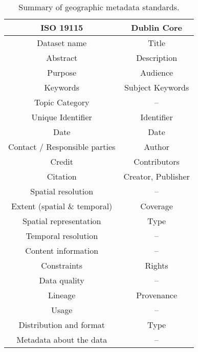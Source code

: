 \documentclass{isprs} %
\begin{document}
\begin{table}[h]
	\centering
		\begin{tabular}{|c|c|}\hline
		    ISO 19115 &                     Dublin Core\\\hline
			Dataset name &                  Title  \\
			Abstract &                      Description \\
			Purpose &                       Audience \\
			Keywords &                      Subject Keywords \\
			Topic Category &                -- \\
			Unique Identifier &             Identifier \\
			Date &                          Date \\
			Contact / Responsible parties&  Author \\
			Credit &                        Contributors \\ 
			Citation &                      Creator, Publisher \\
			Spatial resolution &            -- \\
			Extent (spatial \& temporal) &  Coverage \\
			Spatial representation &        Type \\
			Temporal resolution &           -- \\
			Content information &           -- \\
			Constraints &                   Rights \\ 
			Data quality &                  -- \\
			Lineage &                       Provenance \\
			Usage &                         -- \\
			Distribution and format &       Type \\
			Metadata about the data &       -- \\
			\hline
		\end{tabular}
	\caption{Summary of geographic metadata standards.}
\label{tab:Metadata_Standards}
\end{table}
\end{document}
